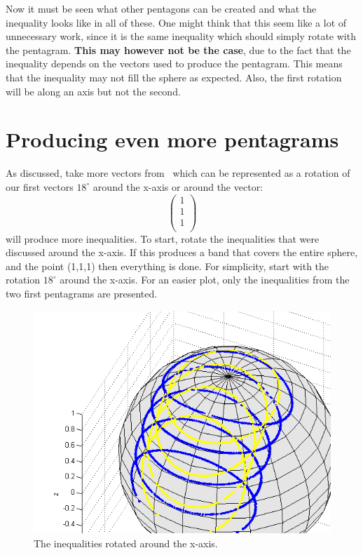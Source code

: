 \documentclass[
  utf8,%
  parskip,%
  largesmallcaps,intlimits,widermath,%
  sharecounter,nobreak,definition=marks,%
  noparts%
]{rtthesis}
\begin{document}
Now it must be seen what other pentagons can be created and what the inequality looks like in all of these.
One might think that this seem like a lot of unnecessary work, since it is the same inequality which should simply rotate with the pentagram. \textbf{This may however not be the case}, due to the fact that the inequality depends on the vectors used to produce the pentagram. This means that the inequality may not fill the sphere as expected. Also, the first rotation will be along an axis but not the second.
\newpage
\section{Producing even more pentagrams}
As discussed, take more vectors from~\cite{Kochen1968The} which can be represented as a rotation of our first vectors $18^\circ$ around the x-axis or around the vector: 
\begin{equation*}
\begin{pmatrix}
1\\
1\\
1\\
\end{pmatrix}
\end{equation*}
will produce more inequalities.
To start, rotate the inequalities that were discussed around the x-axis. If this produces a band that covers the entire sphere, and the point (1,1,1) then everything is done.
For simplicity, start with the rotation $18^\circ$ around the x-axis. For an easier plot, only the inequalities from the two first pentagrams are presented.
\begin{figure}[H]
\begin{center}
\includegraphics[scale=0.5]{ine12all.png}
\caption{The inequalities rotated around the x-axis.}
\label{fig:ine12all}
\end{center}
\end{figure}
\end{document}

